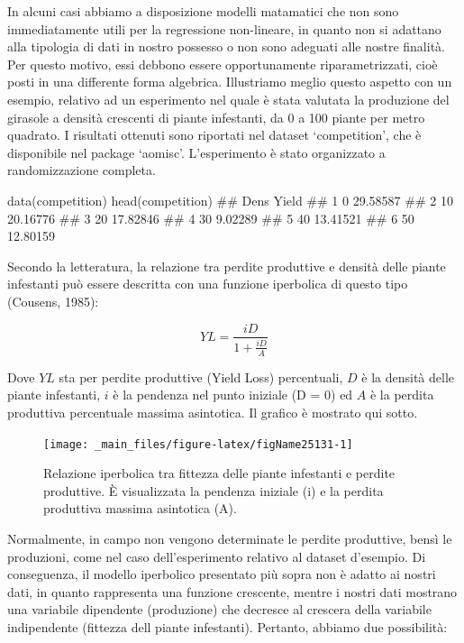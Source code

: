 \documentclass[a4paper,12pt,oneside]{book}
\newenvironment{Shaded}{\begin{snugshade}}{\end{snugshade}}
\newcommand{\DocumentationTok}[1]{#1}
\newcommand{\FunctionTok}[1]{#1}
\newcommand{\NormalTok}[1]{#1}
\begin{document}
In alcuni casi abbiamo a disposizione modelli matamatici che non sono immediatamente utili per la regressione non-lineare, in quanto non si adattano alla tipologia di dati in nostro possesso o non sono adeguati alle nostre finalità. Per questo motivo, essi debbono essere opportunamente riparametrizzati, cioè posti in una differente forma algebrica. Illustriamo meglio questo aspetto con un esempio, relativo ad un esperimento nel quale è stata valutata la produzione del girasole a densità crescenti di piante infestanti, da 0 a 100 piante per metro quadrato. I risultati ottenuti sono riportati nel dataset `competition', che è disponibile nel package `aomisc'. L'esperimento è stato organizzato a randomizzazione completa.

\begin{Shaded}
\begin{Highlighting}[]
\FunctionTok{data}\NormalTok{(competition)}
\FunctionTok{head}\NormalTok{(competition)}
\DocumentationTok{\#\#   Dens    Yield}
\DocumentationTok{\#\# 1    0 29.58587}
\DocumentationTok{\#\# 2   10 20.16776}
\DocumentationTok{\#\# 3   20 17.82846}
\DocumentationTok{\#\# 4   30  9.02289}
\DocumentationTok{\#\# 5   40 13.41521}
\DocumentationTok{\#\# 6   50 12.80159}
\end{Highlighting}
\end{Shaded}

Secondo la letteratura, la relazione tra perdite produttive e densità delle piante infestanti può essere descritta con una funzione iperbolica di questo tipo (Cousens, 1985):

\[YL = \frac{iD}{1 + \frac{iD}{A}}\]

Dove \(YL\) sta per perdite produttive (Yield Loss) percentuali, \(D\) è la densità delle piante infestanti, \(i\) è la pendenza nel punto iniziale (D = 0) ed \(A\) è la perdita produttiva percentuale massima asintotica. Il grafico è mostrato qui sotto.

\begin{figure}

{\centering \texttt{[image: \_main\_files/figure-latex/figName25131-1]} 

}

\caption{Relazione iperbolica tra fittezza delle piante infestanti e perdite produttive. È  visualizzata la pendenza iniziale (i) e la perdita produttiva massima asintotica (A).}\label{fig:figName25131}
\end{figure}

Normalmente, in campo non vengono determinate le perdite produttive, bensì le produzioni, come nel caso dell'esperimento relativo al dataset d'esempio. Di conseguenza, il modello iperbolico presentato più sopra non è adatto ai nostri dati, in quanto rappresenta una funzione crescente, mentre i nostri dati mostrano una variabile dipendente (produzione) che decresce al crescera della variabile indipendente (fittezza dell piante infestanti). Pertanto, abbiamo due possibilità:
\end{document}

